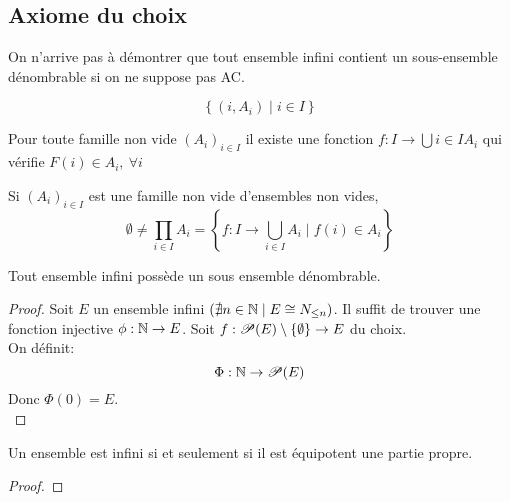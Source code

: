 \subsection{Axiome du choix}

On n'arrive pas à démontrer que tout ensemble infini contient un sous-ensemble dénombrable si on ne suppose pas AC.


\begin{definition}[Famille]
	$$ \left\{ (i, A_i) \mid i \in I \right\} $$

\end{definition}

\begin{axiom}
	Pour toute famille non vide $(A_i)_{i \in I}$ il existe une fonction
	$f : I \to \bigcup{i \in I} A_i$ qui vérifie $F(i) \in A_i, \ \forall i$
\end{axiom}

\begin{axiom}
	Si $(A_i)_{i \in I}$ est une famille non vide d'ensembles non vides,
	$$ \emptyset \neq \prod_{i \in I} A_i = \left\{ f: I \to \bigcup\limits_{i \in I} A_i  \mid f(i) \in A_i \right\} $$
\end{axiom}

\begin{theorem}
	Tout ensemble infini possède un sous ensemble dénombrable.
\end{theorem}

\begin{proof}
	Soit $E$ un ensemble infini $(\nexists n \in \mathbb{N} \mid E \cong N_{\leq n})$. Il suffit de trouver une fonction injective
	$\phi : \mathbb{N} \to E$. Soit $f: \mathscr{P}(E)\setminus\{\emptyset\} \to E$ du choix.\\
	On définit:
	$$ \Phi : \mathbb{N} \to \mathscr{P}(E) $$
	Donc $ \Phi (0) = E$.\\
\end{proof}

\begin{prop}
	Un ensemble est infini si et seulement si il est équipotent  une partie propre.
\end{prop}

\begin{proof}
\end{proof}


